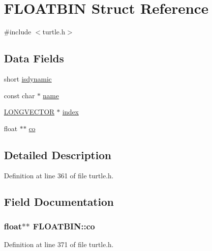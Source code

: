 \hypertarget{struct_f_l_o_a_t_b_i_n}{\section{F\-L\-O\-A\-T\-B\-I\-N Struct Reference}
\label{struct_f_l_o_a_t_b_i_n}
}


{\ttfamily \#include $<$turtle.\-h$>$}

\subsection*{Data Fields}
\begin{DoxyCompactItemize}
\item 
short \hyperlink{struct_f_l_o_a_t_b_i_n_a89c2dc26cd1948fc8bf3dd37fbe61941}{isdynamic}
\item 
const char $\ast$ \hyperlink{struct_f_l_o_a_t_b_i_n_a2be70d1883990d65b5d830f42e40b6c4}{name}
\item 
\hyperlink{struct_l_o_n_g_v_e_c_t_o_r}{L\-O\-N\-G\-V\-E\-C\-T\-O\-R} $\ast$ \hyperlink{struct_f_l_o_a_t_b_i_n_a8f47d03b13305d9d9ae7ec4b9df99e87}{index}
\item 
float $\ast$$\ast$ \hyperlink{struct_f_l_o_a_t_b_i_n_a9d84d403a1acb7d1523235f221e8bd4d}{co}
\end{DoxyCompactItemize}


\subsection{Detailed Description}


Definition at line 361 of file turtle.\-h.



\subsection{Field Documentation}
\hypertarget{struct_f_l_o_a_t_b_i_n_a9d84d403a1acb7d1523235f221e8bd4d}{
\subsubsection[{co}]{\setlength{\rightskip}{0pt plus 5cm}float$\ast$$\ast$ F\-L\-O\-A\-T\-B\-I\-N\-::co}}\label{struct_f_l_o_a_t_b_i_n_a9d84d403a1acb7d1523235f221e8bd4d}


Definition at line 371 of file turtle.\-h.

